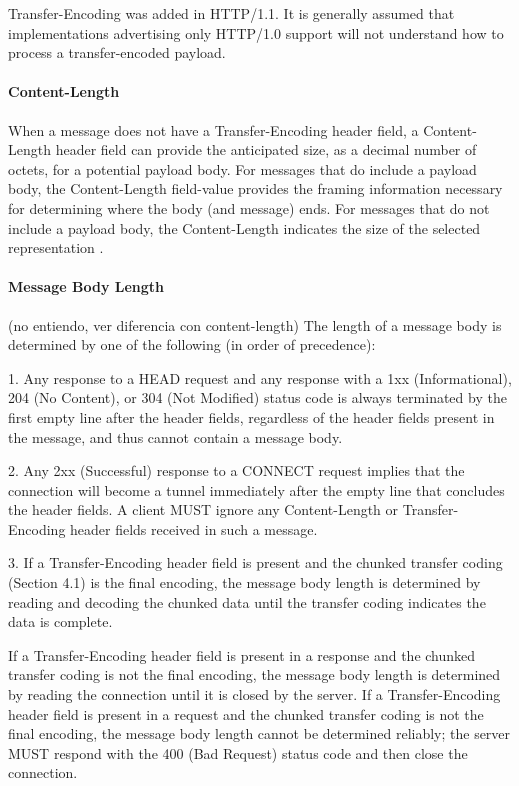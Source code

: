 Transfer-Encoding was added in HTTP/1.1.  It is generally assumed
that implementations advertising only HTTP/1.0 support will not
understand how to process a transfer-encoded payload. 

\paragraph*{Content-Length }
When a message does not have a Transfer-Encoding header field, a
   Content-Length header field can provide the anticipated size, as a
   decimal number of octets, for a potential payload body.  For messages
   that do include a payload body, the Content-Length field-value
   provides the framing information necessary for determining where the
   body (and message) ends.  For messages that do not include a payload
   body, the Content-Length indicates the size of the selected
   representation .

    

\paragraph*{Message Body Length }

(no entiendo, ver diferencia con content-length)
The length of a message body is determined by one of the following
(in order of precedence):

1.  Any response to a HEAD request and any response with a 1xx
    (Informational), 204 (No Content), or 304 (Not Modified) status
    code is always terminated by the first empty line after the
    header fields, regardless of the header fields present in the
    message, and thus cannot contain a message body.

2.  Any 2xx (Successful) response to a CONNECT request implies that
    the connection will become a tunnel immediately after the empty
    line that concludes the header fields.  A client MUST ignore any
    Content-Length or Transfer-Encoding header fields received in
    such a message.

3.  If a Transfer-Encoding header field is present and the chunked
    transfer coding (Section 4.1) is the final encoding, the message
    body length is determined by reading and decoding the chunked
    data until the transfer coding indicates the data is complete.

    If a Transfer-Encoding header field is present in a response and
    the chunked transfer coding is not the final encoding, the
    message body length is determined by reading the connection until
    it is closed by the server.  If a Transfer-Encoding header field
    is present in a request and the chunked transfer coding is not
    the final encoding, the message body length cannot be determined
    reliably; the server MUST respond with the 400 (Bad Request)
    status code and then close the connection.

